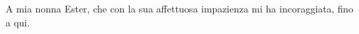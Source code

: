 \null\vfill
\begin{flushright}
{\ttfamily A mia nonna Ester, che con la sua affettuosa impazienza mi ha incoraggiata, fino a qui.}
\end{flushright}
\vfill\vfill